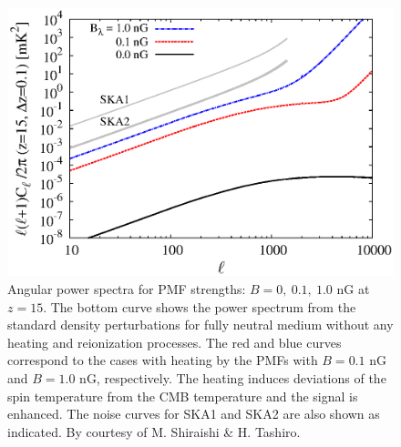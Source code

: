 \documentclass{PoS}
\begin{document}
\begin{figure}[]
\includegraphics[width=0.6\linewidth,angle=0]{figs/KI_fig2.eps}
\caption{Angular power spectra for PMF strengths: $B=0,~ 0.1,~ 1.0$ nG
at $z=15$. The bottom curve shows the power spectrum from the standard
density perturbations for fully neutral medium without any heating and
reionization processes. The red and blue curves correspond to the cases
with heating by the PMFs with $B=0.1$ nG and $B=1.0$ nG,
respectively. The heating induces deviations of the spin temperature
from the CMB temperature and the signal is enhanced. The noise curves
for SKA1 and SKA2 are also shown as indicated. By courtesy of
M. Shiraishi \& H. Tashiro.}  \label{fig:KI2}
\end{figure}



\end{document}
